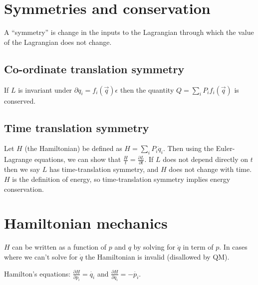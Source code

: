 \documentclass[12pt]{article}
\begin{document}
\section{Symmetries and conservation}

A ``symmetry'' is change in the inputs to the Lagrangian through which the value
of the Lagrangian does not change.

\subsection{Co-ordinate translation symmetry}

If $L$ is invariant under $\partial q_i = f_i(\overrightarrow{q}) \epsilon$ then
the quantity $Q = \sum_{i} P_{i} f_i(\overrightarrow{q})$ is conserved.

\subsection{Time translation symmetry}

Let $H$ (the Hamiltonian) be defined as $H = \sum_i P_i \dot{q}_i$.  Then using
the Euler-Lagrange equations, we can show that $\frac{H}{t} = \frac{\partial
  L}{\partial t}$.  If $L$ does not depend directly on $t$ then we say $L$ has
time-translation symmetry, and $H$ does not change with time.  $H$ is the
definition of energy, so time-translation symmetry implies energy conservation.

\section{Hamiltonian mechanics}

$H$ can be written as a function of $p$ and $q$ by solving for $\dot q$ in term
of $p$.  In cases where we can't solve for $\dot q$ the Hamiltonian is invalid
(disallowed by QM).

Hamilton's equations: $\frac{\partial H}{\partial p_i}=\dot{q_i}$ and
$\frac{\partial H}{\partial q_i}=-\dot{p_i}$.
\end{document}
